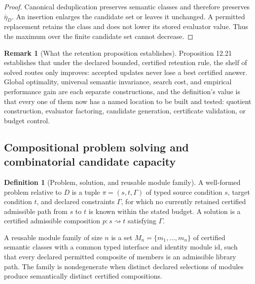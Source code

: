 \documentclass[11pt]{article}
\theoremstyle{definition}
\newtheorem{definition}{Definition}
\newtheorem{remark}{Remark}
\begin{document}
\begin{proof}
Canonical deduplication preserves semantic classes and therefore preserves $\bar{\eta}_D$. An insertion enlarges the candidate set or leaves it unchanged. A permitted replacement retains the class and does not lower its stored evaluator value. Thus the maximum over the finite candidate set cannot decrease.
\end{proof}

\begin{remark}[What the retention proposition establishes]
Proposition 12.21 establishes that under the declared bounded, certified retention rule, the shelf of solved routes only improves: accepted updates never lose a best certified answer. Global optimality, universal semantic invariance, search cost, and empirical performance gain are each separate constructions, and the definition's value is that every one of them now has a named location to be built and tested: quotient construction, evaluator factoring, candidate generation, certificate validation, or budget control.
\end{remark}

\subsection{Compositional problem solving and combinatorial candidate capacity}

\begin{definition}[Problem, solution, and reusable module family]
A well-formed problem relative to $D$ is a tuple $\pi = (s, t, \Gamma)$ of typed source condition $s$, target condition $t$, and declared constraints $\Gamma$, for which no currently retained certified admissible path from $s$ to $t$ is known within the stated budget. A solution is a certified admissible composition $p : s \rightsquigarrow t$ satisfying $\Gamma$.

A reusable module family of size $n$ is a set $M_n = \{m_1, \dots, m_n\}$ of certified semantic classes with a common typed interface and identity module $\mathrm{id}$, such that every declared permitted composite of members is an admissible library path. The family is nondegenerate when distinct declared selections of modules produce semantically distinct certified compositions.
\end{definition}
\end{document}
